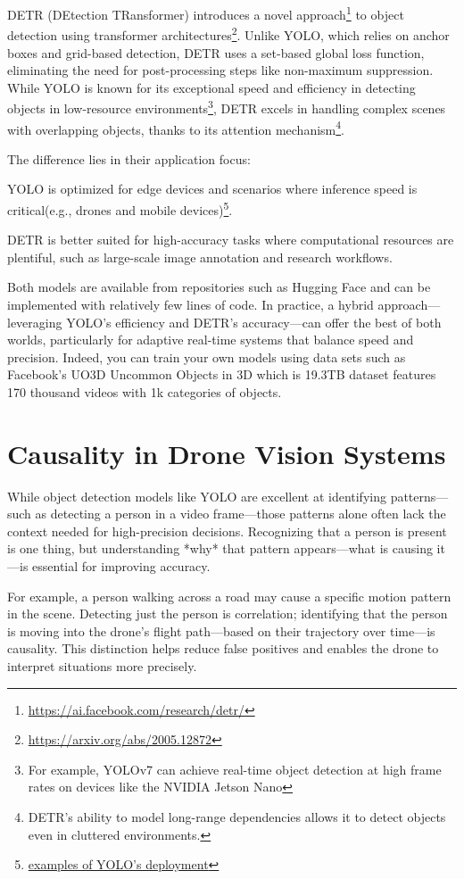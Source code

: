 \documentclass{article}
\newcommand\footurl[1]{\footnote{\url{#1}}}
\newcommand\urllink[2]{#1\footurl{#2}}
\newcommand\foothref[3]{#1\footnote{\href{#2}{#3}}}
\begin{document}
DETR (DEtection TRansformer) \urllink{introduces a novel approach}{https://ai.facebook.com/research/detr/} to object detection using transformer architectures\footurl{https://arxiv.org/abs/2005.12872}. Unlike YOLO, which relies on anchor boxes and grid-based detection, DETR uses a set-based global loss function, eliminating the need for post-processing steps like non-maximum suppression.
While YOLO is known for its exceptional speed and efficiency in detecting objects in low-resource environments\footnote{For example, YOLOv7 can achieve real-time object detection at high frame rates on devices like the NVIDIA Jetson Nano}, DETR excels in handling complex scenes with overlapping objects, thanks to its attention mechanism\footnote{DETR's ability to model long-range dependencies allows it to detect objects even in cluttered environments.}.


The difference lies in their application focus:

YOLO is optimized for edge devices and scenarios where inference speed is critical\foothref{(e.g., drones and mobile devices)}{https://www.edge-ai-vision.com/}{examples of YOLO's deployment}.

DETR is better suited for high-accuracy tasks where computational resources are plentiful, such as large-scale image annotation and research workflows.

Both models are available from repositories such as Hugging Face and can be implemented with relatively few lines of code. In practice, a hybrid approach—leveraging YOLO’s efficiency and DETR’s accuracy—can offer the best of both worlds, particularly for adaptive real-time systems that balance speed and precision.
Indeed, you can train your own models using data sets such as Facebook's UO3D Uncommon Objects in 3D which is 19.3TB dataset features 170 thousand videos with 1k categories of objects.
\section*{Causality in Drone Vision Systems}

While object detection models like YOLO are excellent at identifying patterns—such as detecting a person in a video frame—those patterns alone often lack the context needed for high-precision decisions. Recognizing that a person is present is one thing, but understanding *why* that pattern appears—what is causing it—is essential for improving accuracy.

For example, a person walking across a road may cause a specific motion pattern in the scene. Detecting just the person is correlation; identifying that the person is moving into the drone’s flight path—based on their trajectory over time—is causality. This distinction helps reduce false positives and enables the drone to interpret situations more precisely.
\end{document}
